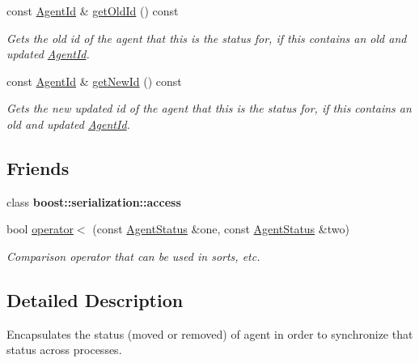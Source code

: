 \begin{DoxyCompactItemize}
const \hyperlink{classrepast_1_1_agent_id}{Agent\-Id} \& \hyperlink{classrepast_1_1_agent_status_a45538390cbcea380e1389c028fb02df4}{get\-Old\-Id} () const 
\begin{DoxyCompactList}\small\item\em Gets the old id of the agent that this is the status for, if this contains an old and updated \hyperlink{classrepast_1_1_agent_id}{Agent\-Id}. \end{DoxyCompactList}\item 
const \hyperlink{classrepast_1_1_agent_id}{Agent\-Id} \& \hyperlink{classrepast_1_1_agent_status_a5cb34086aa619a091038b2ee73fb5e49}{get\-New\-Id} () const 
\begin{DoxyCompactList}\small\item\em Gets the new updated id of the agent that this is the status for, if this contains an old and updated \hyperlink{classrepast_1_1_agent_id}{Agent\-Id}. \end{DoxyCompactList}\end{DoxyCompactItemize}
\subsection*{Friends}
\begin{DoxyCompactItemize}
\item 
\hypertarget{classrepast_1_1_agent_status_ac98d07dd8f7b70e16ccb9a01abf56b9c}{class {\bfseries boost\-::serialization\-::access}}\label{classrepast_1_1_agent_status_ac98d07dd8f7b70e16ccb9a01abf56b9c}

\item 
\hypertarget{classrepast_1_1_agent_status_a7c205f6edb7670c044f5bde072b80470}{bool \hyperlink{classrepast_1_1_agent_status_a7c205f6edb7670c044f5bde072b80470}{operator$<$} (const \hyperlink{classrepast_1_1_agent_status}{Agent\-Status} \&one, const \hyperlink{classrepast_1_1_agent_status}{Agent\-Status} \&two)}\label{classrepast_1_1_agent_status_a7c205f6edb7670c044f5bde072b80470}

\begin{DoxyCompactList}\small\item\em Comparison operator that can be used in sorts, etc. \end{DoxyCompactList}\end{DoxyCompactItemize}


\subsection{Detailed Description}
Encapsulates the status (moved or removed) of agent in order to synchronize that status across processes. 


